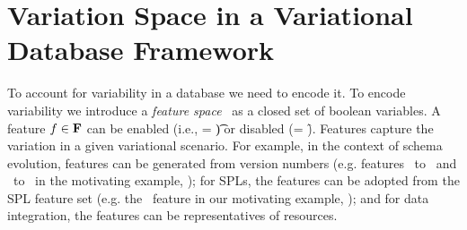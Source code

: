 \section{Variation Space in a Variational Database Framework}
\label{sec:varspace}


To account for variability in a database we need to 
encode it.
%
%
To encode variability we introduce a \emph{feature space} \fSet\ as 
a closed set of boolean variables. 
A feature \ensuremath{\fName \in \fSet} can be enabled (i.e., \fName = \t) or disabled (\fName = \f).
Features capture the variation in a given variational scenario.
%
%
For example, in the context of schema evolution, features can be generated from version 
numbers (e.g. features \vOne\ to \vFive\ and \tOne\ to \tFive\ in the 
motivating example, ); for SPLs, 
the features can be adopted from the SPL feature set (e.g. the \edu\ feature in
our motivating example, ); and 
for data integration, the features can be representatives of resources.  

